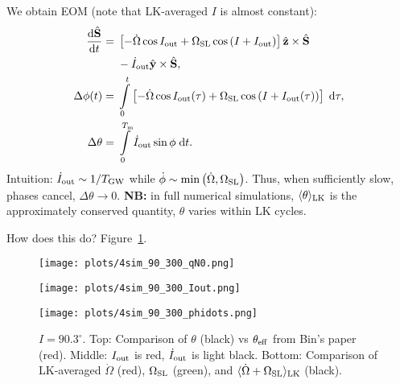 \documentclass[11pt,
        usenames, %
        dvipsnames, %
        twocolumn,
    ]{article}
\newcommand*{\rd}[2]{\frac{\mathrm{d}#1}{\mathrm{d}#2}}
\newcommand*{\bm}[1]{\boldsymbol{\mathbf{#1}}}
\newcommand*{\uv}[1]{\hat{\bm{#1}}}
\newcommand*{\ev}[1]{\langle#1\rangle}
\newcommand*{\p}[1]{\left(#1\right)}
\newcommand*{\s}[1]{\left[#1\right]}
\begin{document}
We obtain EOM (note that LK-averaged $I$ is almost constant):
\begin{align}
    \rd{\uv{S}}{t} ={}& \s{-\dot{\Omega}\cos I_{\rm out}
        + \Omega_{\rm SL}\cos \p{I + I_{\rm out}}}\uv{z} \times
        \uv{S}\nonumber\\
        &- \dot{I}_{\rm out} \uv{y} \times \uv{S},\\
    \Delta \phi(t) ={}& \int\limits_0^t \s{-\dot{\Omega}\cos I_{\rm out}(\tau)
        + \Omega_{\rm SL}\cos \p{I + I_{\rm out}(\tau)}}
            \;\mathrm{d}\tau,\\
    \Delta \theta ={}& \int\limits_0^{T_{\rm m}}
        \dot{I}_{\rm out} \sin \phi\;\mathrm{d}t.
\end{align}
Intuition: $\dot{I}_{\rm out} \sim 1 / T_{\rm GW}$ while $\dot{\phi} \sim
\min\p{\dot{\Omega}, \Omega_{\rm SL}}$. Thus, when sufficiently slow, phases
cancel, $\Delta \theta \to 0$. \textbf{NB:} in full numerical simulations,
$\ev{\theta}_{\rm LK}$ is the approximately conserved quantity, $\theta$ varies
within LK cycles.

How does this do? Figure~\ref{fig:plots}.
\begin{figure}[h]
    \centering
    \texttt{[image: plots/4sim\_90\_300\_qN0.png]}

    \texttt{[image: plots/4sim\_90\_300\_Iout.png]}

    \texttt{[image: plots/4sim\_90\_300\_phidots.png]}
    \caption{$I = 90.3^\circ$. Top: Comparison of $\theta$ (black) vs
    $\theta_{\rm eff}$ from Bin's paper (red). Middle: $I_{\rm out}$ is
    red, $\dot{I}_{\rm out}$ is light black. Bottom: Comparison of LK-averaged
    $\dot{\Omega}$ (red), $\Omega_{\rm SL}$ (green), and $\ev{\dot{\Omega} +
    \Omega_{\rm SL}}_{\rm LK}$ (black).}\label{fig:plots}
\end{figure}
\end{document}
